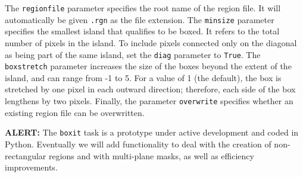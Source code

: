 The {\tt regionfile} parameter specifies the root name of the region file.  It
will automatically be given {\tt .rgn} as the file extension.  
The {\tt minsize} parameter specifies the smallest island that qualifies to be
boxed.  It refers to the total number of pixels in the island. 
To include pixels connected only on the diagonal as being part of the same
island, set the {\tt diag} parameter to {\tt True}.  The {\tt boxstretch}
parameter increases the size of the boxes beyond the extent of the island, and
can range from -1 to 5.  For a value of 1 (the default), the
box is stretched by one pixel in each outward direction; therefore, each side
of the box lengthens by two pixels.  Finally, the parameter {\tt overwrite}
specifies whether an existing region file can be overwritten.

{\bf ALERT:} The {\tt boxit} task is a prototype under active development and
coded in Python. Eventually we will add functionality to deal with the creation of
non-rectangular regions and with multi-plane masks, as well as efficiency
improvements.  %

